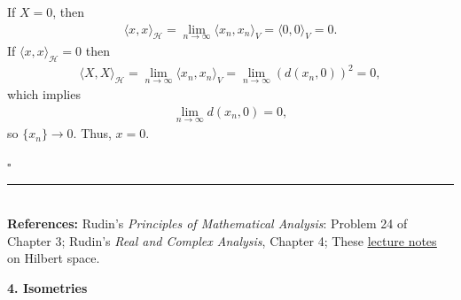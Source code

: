 \documentclass[11pt]{article}
\begin{document}
\begin{enumerate}[(a)]
\begin{itemize}
\begin{enumerate}[(i)]
			
			If $X = 0$, then 
			\begin{align*}
			\langle x,x\rangle_{\mathcal{H}} = \lim_{n\to\infty}\langle x_n,x_n \rangle_V = \langle 0,0\rangle_V = 0.
			\end{align*}
			If $\langle x,x\rangle_\mathcal{H} = 0$ then 
			\begin{align*}
			\langle X,X\rangle_\mathcal{H} =\lim_{n\to\infty}\langle x_n,x_n\rangle_V = \lim_{n\to\infty} (d(x_n,0))^2 =  0,
			\end{align*}
			which implies 
			\begin{align*}
			\lim_{n\to\infty}d(x_n,0) = 0,
			\end{align*}
			so $\{x_n\} \to 0$. Thus, $x = 0$.
		\end{enumerate}		
	\hfill$\square$
	\end{itemize}
\end{enumerate}




\hrule
$\,$\\
\noindent \textbf{References:} Rudin's \textit{Principles of Mathematical Analysis}: Problem 24 of Chapter 3; Rudin's \textit{Real and Complex Analysis}, Chapter 4; These \href{http://www.ma.huji.ac.il/~razk/iWeb/My_Site/Teaching_files/Hilbert.pdf}{\underline{lecture notes}} on Hilbert space. 



\newpage








\noindent \textbf{4. Isometries}
\end{document}
